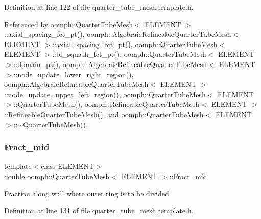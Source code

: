 Definition at line 122 of file quarter\+\_\+tube\+\_\+mesh.\+template.\+h.



Referenced by oomph\+::\+Quarter\+Tube\+Mesh$<$ E\+L\+E\+M\+E\+N\+T $>$\+::axial\+\_\+spacing\+\_\+fct\+\_\+pt(), oomph\+::\+Algebraic\+Refineable\+Quarter\+Tube\+Mesh$<$ E\+L\+E\+M\+E\+N\+T $>$\+::axial\+\_\+spacing\+\_\+fct\+\_\+pt(), oomph\+::\+Quarter\+Tube\+Mesh$<$ E\+L\+E\+M\+E\+N\+T $>$\+::bl\+\_\+squash\+\_\+fct\+\_\+pt(), oomph\+::\+Quarter\+Tube\+Mesh$<$ E\+L\+E\+M\+E\+N\+T $>$\+::domain\+\_\+pt(), oomph\+::\+Algebraic\+Refineable\+Quarter\+Tube\+Mesh$<$ E\+L\+E\+M\+E\+N\+T $>$\+::node\+\_\+update\+\_\+lower\+\_\+right\+\_\+region(), oomph\+::\+Algebraic\+Refineable\+Quarter\+Tube\+Mesh$<$ E\+L\+E\+M\+E\+N\+T $>$\+::node\+\_\+update\+\_\+upper\+\_\+left\+\_\+region(), oomph\+::\+Quarter\+Tube\+Mesh$<$ E\+L\+E\+M\+E\+N\+T $>$\+::\+Quarter\+Tube\+Mesh(), oomph\+::\+Refineable\+Quarter\+Tube\+Mesh$<$ E\+L\+E\+M\+E\+N\+T $>$\+::\+Refineable\+Quarter\+Tube\+Mesh(), and oomph\+::\+Quarter\+Tube\+Mesh$<$ E\+L\+E\+M\+E\+N\+T $>$\+::$\sim$\+Quarter\+Tube\+Mesh().

\mbox{\label{classoomph_1_1QuarterTubeMesh_ac7422bd566e566fd901bbbc98d8cb3b7}} 
\subsubsection{\texorpdfstring{Fract\+\_\+mid}{Fract\_mid}}
{\footnotesize\ttfamily template$<$class E\+L\+E\+M\+E\+NT$>$ \\
double \hyperlink{classoomph_1_1QuarterTubeMesh}{oomph\+::\+Quarter\+Tube\+Mesh}$<$ E\+L\+E\+M\+E\+NT $>$\+::Fract\+\_\+mid\hspace{0.3cm}{\ttfamily [protected]}}



Fraction along wall where outer ring is to be divided. 



Definition at line 131 of file quarter\+\_\+tube\+\_\+mesh.\+template.\+h.

\mbox{\label{classoomph_1_1QuarterTubeMesh_a961bf18652514913c6a63c4850088e8b}} 
